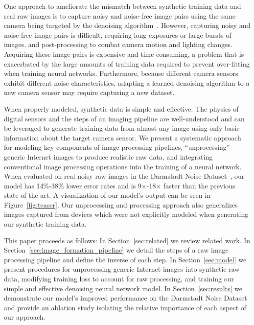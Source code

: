 \documentclass[10pt,twocolumn,letterpaper]{article}
\begin{document}
One approach to ameliorate the mismatch between synthetic training data and real raw images is to capture noisy and noise-free image pairs using the same camera being targeted by the denoising algorithm~\cite{SIDD, chen2018cvpr, schwartz2018itip}. However, capturing noisy and noise-free image pairs is difficult, requiring long exposures or large bursts of images, and post-processing to combat camera motion and lighting changes. Acquiring these image pairs is expensive and time consuming, a problem that is exacerbated by the large amounts of training data required to prevent over-fitting when training neural networks. Furthermore, because different camera sensors exhibit different noise characteristics, adapting a learned denoising algorithm to a new camera sensor may require capturing a new dataset.

When properly modeled, synthetic data is simple and effective. The physics of digital sensors and the steps of an imaging pipeline are well-understood and can be leveraged to generate training data from almost any image using only basic information about the target camera sensor. We present a systematic approach for modeling key components of image processing pipelines, ``unprocessing'' generic Internet images to produce realistic raw data, and integrating conventional image processing operations into the training of a neural network. 
When evaluated on real noisy raw images in the Darmstadt Noise Dataset~\cite{plotz2017cvpr}, our model has 14$\%$-38$\%$ lower error rates and is 9$\times$-18$\times$ faster than the previous state of the art. A visualization of our model's output can be seen in Figure~\ref{fig:teaser}. Our unprocessing and processing approach also generalizes images captured from devices which were not explicitly modeled when generating our synthetic training data.


This paper proceeds as follows: In Section~\ref{sec:related} we review related work.
In Section~\ref{sec:image_formation_pipeline} we detail the steps of a raw image processing pipeline and define the inverse of each step.
In Section~\ref{sec:model} we present procedures for unprocessing generic Internet images into synthetic raw data, modifying training loss to account for raw processing, and training our simple and effective denoising neural network model.
In Section~\ref{sec:results} we demonstrate our model's improved performance on the Darmstadt Noise Dataset~\cite{plotz2017cvpr} and provide an ablation study isolating the relative importance of each aspect of our approach.
\end{document}
